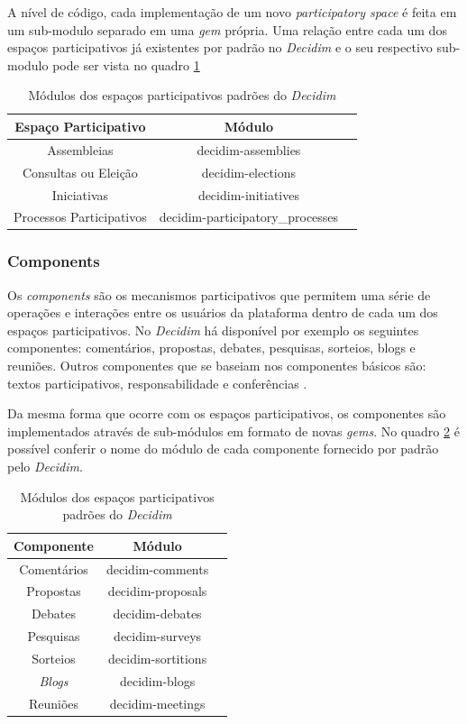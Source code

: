 A nível de código, cada implementação de um novo \textit{participatory space} é feita em um sub-modulo separado em uma \textit{gem} própria. Uma relação entre cada um dos espaços participativos já existentes por padrão no \textit{Decidim} e o seu respectivo sub-modulo pode ser vista no quadro \ref{tab:modulos-participatoryspaces}

\begin{table}
  \centering
  \begin{tabular}{|c|c|c|}
    \hline
    Espaço Participativo & Módulo \\
    \hline
    Assembleias & decidim-assemblies \\
    Consultas ou Eleição & decidim-elections \\
    Iniciativas & decidim-initiatives \\
    Processos Participativos & decidim-participatory\_processes \\
    \hline
  \end{tabular}
  \caption{Módulos dos espaços participativos padrões do \textit{Decidim}}
  \label{tab:modulos-participatoryspaces}
\end{table}

\subsubsection{Components}

Os \textit{components} são os mecanismos participativos que permitem uma série de operações e interações entre os usuários da plataforma dentro de cada um dos espaços participativos. No \textit{Decidim} há disponível por exemplo os seguintes componentes: comentários, propostas, debates, pesquisas, sorteios, blogs e reuniões. Outros componentes que se baseiam nos componentes básicos são: textos participativos, responsabilidade e conferências \cite{decidim-descriptionpage}.

Da mesma forma que ocorre com os espaços participativos, os componentes são implementados através de sub-módulos em formato de novas \textit{gems}. No quadro \ref{tab:modulos-components} é possível conferir o nome do módulo de cada componente fornecido por padrão pelo \textit{Decidim}.

\begin{table}
  \centering
  \begin{tabular}{|c|c|c|}
    \hline
    Componente & Módulo \\
    \hline
    Comentários & decidim-comments \\
    Propostas & decidim-proposals \\
    Debates & decidim-debates \\
    Pesquisas & decidim-surveys \\
    Sorteios & decidim-sortitions \\
    \textit{Blogs} & decidim-blogs \\
    Reuniões & decidim-meetings \\
    \hline
  \end{tabular}
  \caption{Módulos dos espaços participativos padrões do \textit{Decidim}}
  \label{tab:modulos-components}
\end{table}

\section{}